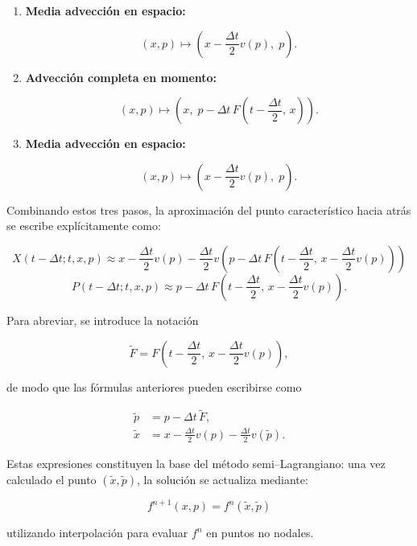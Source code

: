 \documentclass[11pt,a4paper,twoside,pdf]{article}
\numberwithin{equation}{section}
\begin{document}
\begin{enumerate}
\item \textbf{Media advección en espacio:}


\[
(x,p) \longmapsto \left(x - \frac{\Delta t}{2}v(p),\; p\right).
\]



\item \textbf{Advección completa en momento:}


\[
(x,p) \longmapsto \left(x,\; p - \Delta t\,F\!\left(t - \frac{\Delta t}{2},\, x\right)\right).
\]



\item \textbf{Media advección en espacio:}


\[
(x,p) \longmapsto \left(x - \frac{\Delta t}{2}v(p),\; p\right).
\]


\end{enumerate}

Combinando estos tres pasos, la aproximación del punto característico hacia atrás se
escribe explícitamente como:


\[
X(t-\Delta t;t,x,p) \approx x
- \frac{\Delta t}{2}v(p)
- \frac{\Delta t}{2}v\!\left(p - \Delta t\,F\!\left(t-\frac{\Delta t}{2},\, x - \frac{\Delta t}{2}v(p)\right)\right)
\]
\[
P(t-\Delta t;t,x,p) \approx p
- \Delta t\,F\!\left(t-\frac{\Delta t}{2},\, x - \frac{\Delta t}{2}v(p)\right).
\]



Para abreviar, se introduce la notación


\[
\tilde{F} = F\!\left(t-\frac{\Delta t}{2},\, x - \frac{\Delta t}{2}v(p)\right),
\]

de modo que las fórmulas anteriores pueden escribirse como


\[
\begin{aligned}
\tilde{p} &= p - \Delta t\,\tilde{F}, \\[0.3em]
\tilde{x} &= x - \frac{\Delta t}{2}v(p) - \frac{\Delta t}{2}v(\tilde{p}).
\end{aligned}
\]



Estas expresiones constituyen la base del método semi–Lagrangiano: una vez
calculado el punto $(\tilde{x},\tilde{p})$, la solución se actualiza mediante:


\[
f^{n+1}(x,p) = f^{n}(\tilde{x},\tilde{p})
\]


utilizando interpolación para evaluar $f^n$ en puntos no nodales.\\
\end{document}
